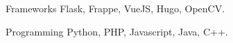 

\begin{cvskills}

  \cvskill
    {Frameworks} %
    {Flask, Frappe, VueJS, Hugo, OpenCV.} %
      
  \cvskill
    {Programming} %
    {Python, PHP, Javascript, Java, C++.} %

\end{cvskills}
